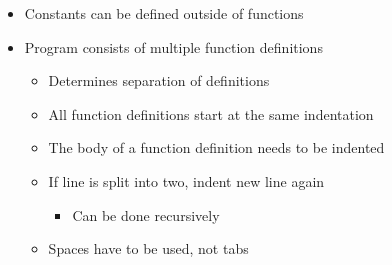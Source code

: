 \begin{itemize}
\begin{itemize}
        \end{itemize}
    \item Constants can be defined outside of functions
    \item Program consists of multiple function definitions
        \begin{itemize}
            \item Determines separation of definitions
            \item All function definitions start at the same indentation
            \item The body of a function definition needs to be indented
            \item If line is split into two, indent new line again
                \begin{itemize}
                    \item Can be done recursively
                \end{itemize}
            \item Spaces have to be used, not tabs
        \end{itemize}
\end{itemize}

